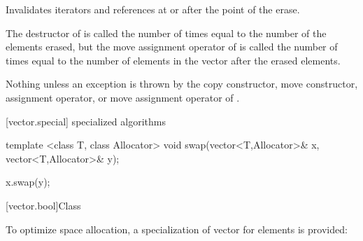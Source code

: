 \begin{itemdescr}
\pnum
\effects
Invalidates iterators and references at or after the point of the erase.

\pnum
\complexity
The destructor of  is called the number of times equal to the
number of the elements erased, but the move assignment operator
of  is called the number of times equal to the number of
elements in the vector after the erased elements.

\pnum
\throws
Nothing unless an exception is thrown by the
copy constructor, move constructor,
assignment operator, or move assignment operator of
.
\end{itemdescr}

[vector.special]{ specialized algorithms}

%
%
\begin{itemdecl}
template <class T, class Allocator>
  void swap(vector<T,Allocator>& x, vector<T,Allocator>& y);
\end{itemdecl}

\begin{itemdescr}
\pnum
\effects
\begin{codeblock}
x.swap(y);
\end{codeblock}
\end{itemdescr}

[vector.bool]{Class }

\pnum
{}%
To optimize space allocation, a specialization of vector for
elements is provided:

